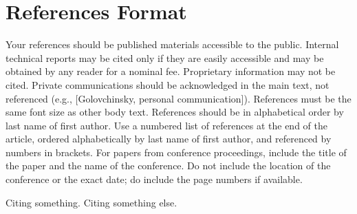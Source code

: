\documentclass{sigchi}
\begin{document}
\section{References Format}
Your references should be published materials accessible to the
public. Internal technical reports may be cited only if they are
easily accessible and may be obtained by any reader for a nominal
fee. Proprietary information may not be cited. Private communications
should be acknowledged in the main text, not referenced (e.g.,
[Golovchinsky, personal communication]). References must be the same
font size as other body text. References should be in alphabetical
order by last name of first author. Use a numbered list of references
at the end of the article, ordered alphabetically by last name of
first author, and referenced by numbers in brackets. For papers from
conference proceedings, include the title of the paper and the name of
the conference. Do not include the location of the conference or the
exact date; do include the page numbers if available. 

Citing something\cite{unrealweb}. Citing something else.\cite{smit54}


\balance{}




\end{document}
